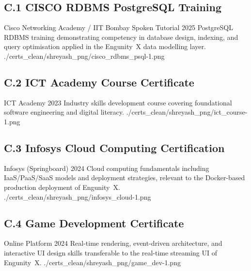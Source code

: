 \subsection*{C.1 \quad CISCO RDBMS PostgreSQL Training}

\certentry
  {Cisco Networking Academy / IIT Bombay Spoken Tutorial}
  {2025}
  {PostgreSQL RDBMS training demonstrating competency in database design,
   indexing, and query optimisation applied in the Engunity~X data modelling
   layer.}
  {./certs_clean/shreyash_png/cisco_rdbms_psql-1.png}

\subsection*{C.2 \quad ICT Academy Course Certificate}

\certentry
  {ICT Academy}
  {2023}
  {Industry skills development course covering foundational software engineering
   and digital literacy.}
  {./certs_clean/shreyash_png/ict_course-1.png}

\subsection*{C.3 \quad Infosys Cloud Computing Certification}

\certentry
  {Infosys (Springboard)}
  {2024}
  {Cloud computing fundamentals including IaaS/PaaS/SaaS models and deployment
   strategies, relevant to the Docker-based production deployment of Engunity~X.}
  {./certs_clean/shreyash_png/infosys_cloud-1.png}

\subsection*{C.4 \quad Game Development Certificate}

\certentry
  {Online Platform}
  {2024}
  {Real-time rendering, event-driven architecture, and interactive UI design
   skills transferable to the real-time streaming UI of Engunity~X.}
  {./certs_clean/shreyash_png/game_dev-1.png}


